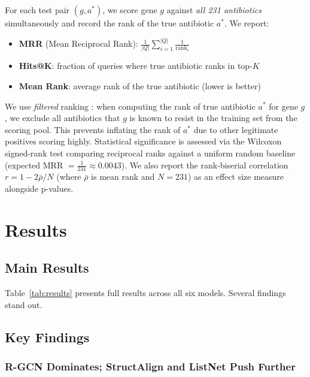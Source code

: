 \documentclass[conference]{IEEEtran}
\begin{document}
For each test pair $(g, a^*)$, we score gene $g$ against \textit{all 231 antibiotics} simultaneously and record the rank of the true antibiotic $a^*$. We report:

\begin{itemize}
    \item \textbf{MRR} (Mean Reciprocal Rank): $\frac{1}{|Q|}\sum_{i=1}^{|Q|} \frac{1}{\text{rank}_i}$
    \item \textbf{Hits@K}: fraction of queries where true antibiotic ranks in top-$K$
    \item \textbf{Mean Rank}: average rank of the true antibiotic (lower is better)
\end{itemize}

We use \textit{filtered} ranking \cite{bordes2013translating}: when computing the rank of true antibiotic $a^*$ for gene $g$, we exclude all antibiotics that $g$ is known to resist in the training set from the scoring pool. This prevents inflating the rank of $a^*$ due to other legitimate positives scoring highly. Statistical significance is assessed via the Wilcoxon signed-rank test comparing reciprocal ranks against a uniform random baseline (expected MRR $= \frac{1}{231} \approx 0.0043$). We also report the rank-biserial correlation $r = 1 - 2\bar{\rho}/N$ (where $\bar{\rho}$ is mean rank and $N=231$) as an effect size measure alongside p-values.

\section{Results}

\subsection{Main Results}

Table~\ref{tab:results} presents full results across all six models. Several findings stand out.



\subsection{Key Findings}

\subsubsection{R-GCN Dominates; StructAlign and ListNet Push Further}
\end{document}
